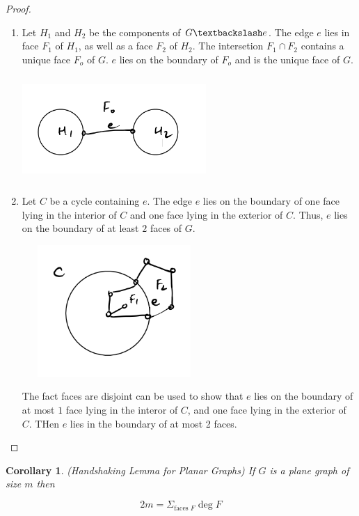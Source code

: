 \documentclass[12pt]{article}
\newtheorem*{corollary}{Corollary}
\newenvironment{pro}{\begin{proof}}{\end{proof}}
\begin{document}
\begin{pro}
	\begin{enumerate}
		\item Let $H_{1}$ and $H_{2}$ be the components of $G\textbackslash e$. The edge $e$ lies in face $F_{1}$ of $H_{1}$, as well as a face $F_{2}$ of $H_{2}$.
		      The intersetion $F_{1}\cap F_{2}$ contains a unique face $F_{o}$ of $G$. $e$ lies on the boundary of $F_{o}$ and is the unique face of $G$.

		      \includegraphics[width=7cm, height=4cm]{proof2}
		\item Let $C$ be a cycle containing $e$. The edge $e$ lies on the boundary of one face lying in the interior of $C$ and one face lying in the exterior of $C$.
		      Thus, $e$ lies on the boundary of at least $2$ faces of $G$.

		      \includegraphics[width=7cm, height=5cm]{proof2.1}

		      The fact faces are disjoint can be used to show that $e$ lies on the boundary of at most $1$ face lying in the interor of $C$, and one face lying in the exterior of $C$. THen $e$ lies in the boundary of at most 2 faces.

	\end{enumerate}

\end{pro}



\begin{corollary}

	(Handshaking Lemma for Planar Graphs)
	If $G$ is a plane graph of size $m$ then

	\[2m = \Sigma_{\text{faces } F} \deg  F\]
\end{corollary}
\end{document}
